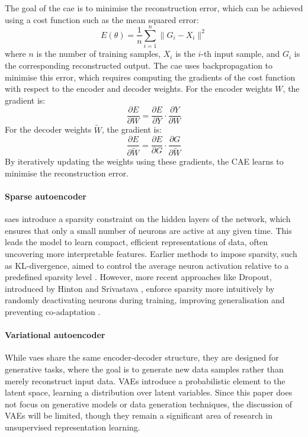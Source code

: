 The goal of the \acrshort{cae} is to minimise the reconstruction error, which can be achieved using a cost function such as the mean squared error:
\[
E(\theta) = \frac{1}{n} \sum_{i=1}^{n} \| G_i - X_i \|^2
\]
where $n$ is the number of training samples, $X_i$ is the $i$-th input sample, and $G_i$ is the corresponding reconstructed output. The \acrshort{cae} uses backpropagation to minimise this error, which requires computing the gradients of the cost function with respect to the encoder and decoder weights. For the encoder weights $W$, the gradient is:
\[
\frac{\partial E}{\partial W} = \frac{\partial E}{\partial Y} \cdot \frac{\partial Y}{\partial W}
\]
For the decoder weights $\tilde{W}$, the gradient is:
\[
\frac{\partial E}{\partial \tilde{W}} = \frac{\partial E}{\partial G} \cdot \frac{\partial G}{\partial \tilde{W}}
\]
By iteratively updating the weights using these gradients, the CAE learns to minimise the reconstruction error.

\paragraph{Sparse autoencoder} \acrshort{sae}s introduce a sparsity constraint on the hidden layers of the network, which ensures that only a small number of neurons are active at any given time. This leads the model to learn compact, efficient representations of data, often uncovering more interpretable features. Earlier methods to impose sparsity, such as KL-divergence, aimed to control the average neuron activation relative to a predefined sparsity level \cite{ng_sparse_2010}. However, more recent approaches like Dropout, introduced by Hinton and Srivastava \cite{hinton_improving_2012, srivastava_dropout_2014}, enforce sparsity more intuitively by randomly deactivating neurons during training, improving generalisation and preventing co-adaptation \cite{muhaddisa_barat_ali_use_2015}.

\paragraph{Variational autoencoder} While \acrshort{vae}s share the same encoder-decoder structure, they are designed for generative tasks, where the goal is to generate new data samples rather than merely reconstruct input data. VAEs introduce a probabilistic element to the latent space, learning a distribution over latent variables. Since this paper does not focus on generative models or data generation techniques, the discussion of VAEs will be limited, though they remain a significant area of research in unsupervised representation learning.

